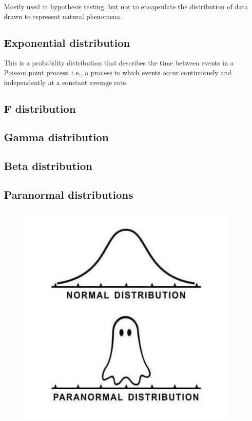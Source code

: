 \documentclass[english,10pt,a4paper,oneside]{book}
\theoremstyle{definition}
\theoremstyle{definition}
\theoremstyle{definition}
\theoremstyle{remark}
\begin{document}
Mostly used in hypothesis testing, but not to encapsulate the
distribution of data drawn to represent natural phenomena.

\subsection{Exponential distribution}\label{exponential-distribution}

This is a probability distribution that describes the time between
events in a Poisson point process, i.e., a process in which events occur
continuously and independently at a constant average rate.

\subsection{F distribution}\label{f-distribution}

\subsection{Gamma distribution}\label{gamma-distribution}

\subsection{Beta distribution}\label{beta-distribution}

\subsection{Paranormal distributions}\label{paranormal-distributions}

\begin{figure}[h!]
\begin{center}
\includegraphics[width=0.7\linewidth]{figures/paranormal_distributions.jpeg}
\end{center}
\end{figure}
\end{document}
